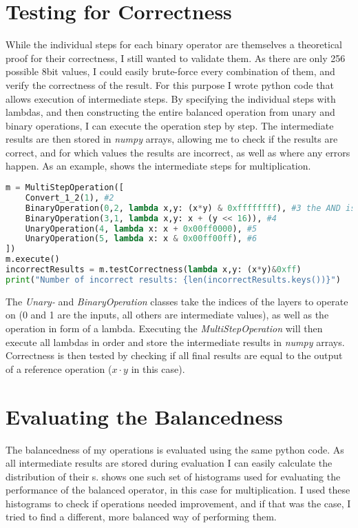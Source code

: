 \section{Testing for Correctness}
\label{correctness}
While the individual steps for each binary operator are themselves a theoretical proof for their correctness, I still wanted to validate them.
As there are only 256 possible 8bit values, I could easily brute-force every combination of them, and verify the correctness of the result.
For this purpose I wrote python code that allows execution of intermediate steps.
By specifying the individual steps with lambdas, and then constructing the entire balanced operation from unary and binary operations, I can execute the operation step by step.
The intermediate results are then stored in \emph{numpy} arrays, allowing me to check if the results are correct, and for which values the results are incorrect, as well as where any errors happen.
As an example,  shows the intermediate steps for multiplication.

\begin{lstlisting}[language=python, caption=Step-by-step execution of balanced multiplication, label=lst:multiop]
m = MultiStepOperation([
    Convert_1_2(1), #2
    BinaryOperation(0,2, lambda x,y: (x*y) & 0xffffffff), #3 the AND is required due to python's arbitrary precision integers
    BinaryOperation(3,1, lambda x,y: x + (y << 16)), #4
    UnaryOperation(4, lambda x: x + 0x00ff0000), #5
    UnaryOperation(5, lambda x: x & 0x00ff00ff), #6
])
m.execute()
incorrectResults = m.testCorrectness(lambda x,y: (x*y)&0xff)
print("Number of incorrect results: {len(incorrectResults.keys())}")
\end{lstlisting}

The \emph{Unary-} and \emph{BinaryOperation} classes take the indices of the layers to operate on (0 and 1 are the inputs, all others are intermediate values), as well as the operation in form of a lambda.
Executing the \emph{MultiStepOperation} will then execute all lambdas in order and store the intermediate results in \emph{numpy} arrays.
Correctness is then tested by checking if all final results are equal to the output of a reference operation ($x \cdot y$ in this case).

\section{Evaluating the Balancedness}
\label{balance-eval}
The balancedness of my operations is evaluated using the same python code.
As all intermediate results are stored during evaluation I can easily calculate the distribution of their \hammingw{}s.
 shows one such set of histograms used for evaluating the performance of the balanced operator, in this case for multiplication.
I used these histograms to check if operations needed improvement, and if that was the case, I tried to find a different, more balanced way of performing them.

